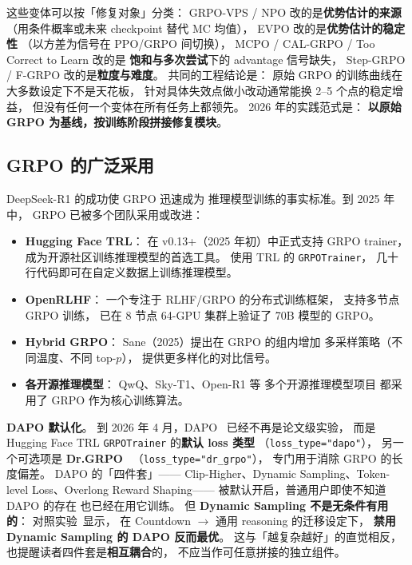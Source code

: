 这些变体可以按「修复对象」分类：
GRPO-VPS / NPO 改的是\textbf{优势估计的来源}
（用条件概率或未来 checkpoint 替代 MC 均值），
EVPO 改的是\textbf{优势估计的稳定性}
（以方差为信号在 PPO/GRPO 间切换），
MCPO / CAL-GRPO / Too Correct to Learn 改的是
\textbf{饱和与多次尝试}下的 advantage 信号缺失，
Step-GRPO / F-GRPO 改的是\textbf{粒度与难度}。
共同的工程结论是：
原始 GRPO 的训练曲线在大多数设定下不是天花板，
针对具体失效点做小改动通常能换 2--5 个点的稳定增益，
但没有任何一个变体在所有任务上都领先。
2026 年的实践范式是：
\textbf{以原始 GRPO 为基线，按训练阶段拼接修复模块}。

\subsection{GRPO 的广泛采用}

DeepSeek-R1 的成功使 GRPO 迅速成为
推理模型训练的事实标准。到 2025 年中，
GRPO 已被多个团队采用或改进：

\begin{itemize}[noitemsep]
  \item \textbf{Hugging Face TRL}：
        在 v0.13+（2025 年初）中正式支持 GRPO trainer，
        成为开源社区训练推理模型的首选工具。
        使用 TRL 的 \texttt{GRPOTrainer}，
        几十行代码即可在自定义数据上训练推理模型。
  \item \textbf{OpenRLHF}：
        一个专注于 RLHF/GRPO 的分布式训练框架，
        支持多节点 GRPO 训练，
        已在 8 节点 64-GPU 集群上验证了 70B 模型的 GRPO。
  \item \textbf{Hybrid GRPO}：
        Sane（2025）提出在 GRPO 的组内增加
        多采样策略（不同温度、不同 top-$p$），
        提供更多样化的对比信号。
  \item \textbf{各开源推理模型}：
        QwQ、Sky-T1、Open-R1 等
        多个开源推理模型项目
        都采用了 GRPO 作为核心训练算法。
\end{itemize}

\textbf{DAPO 默认化}。
到 2026 年 4 月，DAPO~\cite{yu2025dapo} 已经不再是论文级实验，
而是 Hugging Face TRL \texttt{GRPOTrainer} 的\textbf{默认 loss 类型}
（\texttt{loss\_type="dapo"}），
另一个可选项是 \textbf{Dr.GRPO}~\cite{liu2025drgrpo}
（\texttt{loss\_type="dr\_grpo"}），
专门用于消除 GRPO 的长度偏差。
DAPO 的「四件套」——
Clip-Higher、Dynamic Sampling、Token-level Loss、Overlong Reward Shaping——
被默认开启，普通用户即使不知道 DAPO 的存在
也已经在用它训练。
但 \textbf{Dynamic Sampling 不是无条件有用的}：
对照实验~\cite{dapo_dynamic_sampling_ablation2026}显示，
在 Countdown $\to$ 通用 reasoning 的迁移设定下，
\textbf{禁用 Dynamic Sampling 的 DAPO 反而最优}。
这与「越复杂越好」的直觉相反，
也提醒读者四件套是\textbf{相互耦合}的，
不应当作可任意拼接的独立组件。

